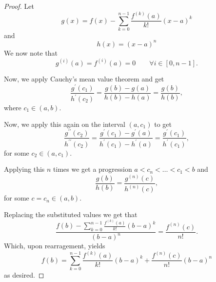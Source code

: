 \documentclass[twoside]{article}
\begin{document}
    \begin{proof}
        Let 
        \begin{equation*}
            g(x) = f(x) - \sum_{k = 0}^{n - 1} \frac{f^{(k)}(a)}{k!}(x - a)^{k}
        \end{equation*}
        and 
        \begin{equation*}
            h(x) = (x - a)^{n}
        \end{equation*}
        We now note that
        \begin{equation*}
            g^{(i)}(a) = f^{(i)}(a) = 0 \qquad  \forall i \in [0, n - 1].
        \end{equation*}
        
        Now, we apply Cauchy's mean value theorem and get
        \begin{equation*}
            \frac{g^{\prime}(c_{1})}{h^{\prime}(c_{2})} = \frac{g(b) - g(a)}{h(b) - h(a)} = \frac{g(b)}{h(b)},
        \end{equation*}
        where $c_{1} \in (a,b)$.

        Now, we apply this again on the interval $(a, c_{1})$ to get
        \begin{equation*}
            \frac{g^{\prime\prime}(c_{2})}{h^{\prime\prime}(c_{2})} 
            = \frac{g^{\prime}(c_{1}) - g^{\prime}(a)}{h^{\prime}(c_{1}) - h^{\prime}(a)} 
            = \frac{g^{\prime}(c_{1})}{h^{\prime}(c_{1})},
        \end{equation*}
        for some $c_{2} \in (a, c_{1})$.

        Applying this $n$ times we get a progression $a < c_{n} < \dots < c_{1} < b$ and
        \begin{equation*}
            \frac{g(b)}{h(b)} = \frac{g^{(n)}(c)}{h^{(n)}(c)},
        \end{equation*}
        for some $c = c_{n} \in (a,b)$.

        Replacing the substituted values we get that
        \begin{equation*}
            \frac{f(b) - \sum_{k = 0}^{n - 1} \frac{f^{(k)}(a)}{k!}(b - a)^{k}}{(b - a)^{n}} = \frac{f^{(n)}(c)}{n!}.
        \end{equation*}
        Which, upon rearragement, yields
        \begin{equation*}
            f(b) = \sum_{k = 0}^{n - 1} \frac{f^{(k)}(a)}{k!}(b - a)^{k} + \frac{f^{(n)}(c)}{n!}(b-a)^{n}
        \end{equation*}
        as desired.
    \end{proof}
\end{document}
